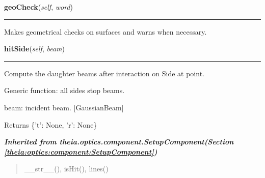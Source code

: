     \label{theia:optics:optic:Optic:geoCheck}

    \vspace{0.5ex}

\hspace{.8\funcindent}\begin{boxedminipage}{\funcwidth}

    \raggedright \textbf{geoCheck}(\textit{self}, \textit{word})

    \vspace{-1.5ex}

    \rule{\textwidth}{0.5\fboxrule}
\setlength{\parskip}{2ex}
    Makes geometrical checks on surfaces and warns when necessary.

\setlength{\parskip}{1ex}
    \end{boxedminipage}

    \label{theia:optics:optic:Optic:hitSide}

    \vspace{0.5ex}

\hspace{.8\funcindent}\begin{boxedminipage}{\funcwidth}

    \raggedright \textbf{hitSide}(\textit{self}, \textit{beam})

    \vspace{-1.5ex}

    \rule{\textwidth}{0.5\fboxrule}
\setlength{\parskip}{2ex}
    Compute the daughter beams after interaction on Side at point.

    Generic function: all sides stop beams.

    beam: incident beam. [GaussianBeam]

    Returns \{'t': None, 'r': None\}

\setlength{\parskip}{1ex}
    \end{boxedminipage}


\large{\textbf{\textit{Inherited from theia.optics.component.SetupComponent\textit{(Section \ref{theia:optics:component:SetupComponent})}}}}

\begin{quote}
\_\_str\_\_(), isHit(), lines()
\end{quote}

